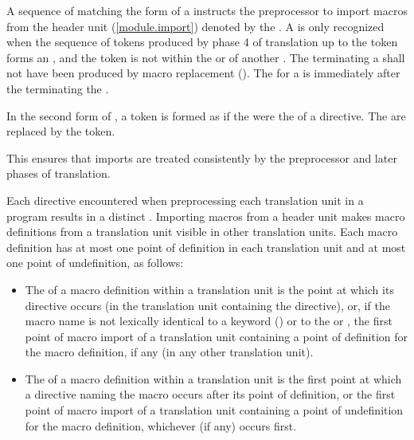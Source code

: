 \begin{std.txt}
\color{addclr}
\pnum
A sequence of  matching the form
of a 
instructs the preprocessor to import macros from the header unit
(\ref{module.import}) denoted by the .
A  is only recognized when the sequence of tokens
produced by phase 4 of translation up to the  token
forms an , and the  token is not
within the  or
 of another .
The \tcode{;} 
terminating a 
shall not have been produced by
macro replacement ().
The  for a  is
immediately after the \tcode{;} terminating the .

\color{addclr}
\pnum
In the second form of ,
a  token is formed as if
the 
were the  of a  directive.
The  are replaced by
the  token.
\begin{note}
This ensures that imports are treated consistently by
the preprocessor and later phases of translation.
\end{note}

\color{addclr}
\pnum
Each  directive encountered when preprocessing
each translation unit in a program results in a distinct
.
Importing macros from a header unit makes macro definitions
from a translation unit visible in other translation units.
Each macro definition has at most one point of definition in
each translation unit and at most one point of undefinition, as follows:
\begin{itemize}
\item
The  of a macro definition within a translation unit
is the point at which its  directive occurs (in the translation
unit containing the  directive), or,
if the macro name is not lexically identical to a keyword ()
or to the   or ,
the first point
of macro import of a translation unit containing a point of definition for the
macro definition, if any (in any other translation unit).

\item
The  of a macro definition within a translation unit
is the first point at which a  directive naming the macro occurs
after its point of definition, or the first point
of macro import of a translation unit containing a point of undefinition for the
macro definition, whichever (if any) occurs first.
\end{itemize}


\end{std.txt}
